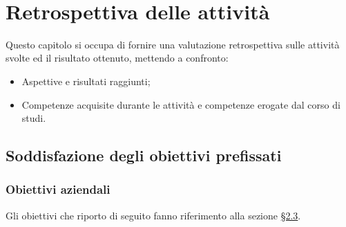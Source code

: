 \newpage \ \thispagestyle{empty} \newpage
\chapter{Retrospettiva delle attività}
\label{cap:resoconto}
Questo capitolo si occupa di fornire una valutazione retrospettiva sulle attività svolte ed il risultato ottenuto, mettendo a confronto:
\begin{itemize}
    \item Aspettive e risultati raggiunti;
    \item Competenze acquisite durante le attività e competenze erogate dal corso di studi.
\end{itemize}

\section{Soddisfazione degli obiettivi prefissati}

\subsection{Obiettivi aziendali}
Gli obiettivi che riporto di seguito fanno riferimento alla sezione \hyperref[sec:obiettivi-aziendali]{§2.3}.
